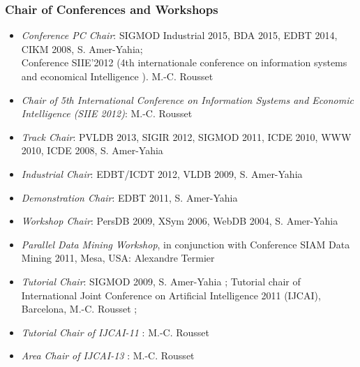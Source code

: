 \subsubsection*{Chair  of Conferences and Workshops}

\begin{itemize}
\setlength{\itemindent}{-0.5cm}
\setlength{\itemsep}{-0.1cm}

\item \emph{Conference PC Chair}: SIGMOD Industrial 2015, BDA 2015, EDBT 2014, CIKM 2008,  S. Amer-Yahia;  \\ 
Conference SIIE'2012 (4th internationale conference  on information systems and economical Intelligence ). M.-C. Rousset 

\item \emph{ Chair of 5th International Conference on Information Systems and Economic Intelligence (SIIE 2012)}: M.-C. Rousset


\item \emph{Track Chair}: PVLDB 2013, SIGIR 2012, SIGMOD 2011, ICDE 2010, WWW 2010, ICDE 2008, S. Amer-Yahia

\item \emph{Industrial Chair}: EDBT/ICDT 2012, VLDB 2009,  S. Amer-Yahia

\item \emph{Demonstration Chair}: EDBT 2011, S. Amer-Yahia

\item \emph{Workshop Chair}: PersDB 2009, XSym 2006, WebDB 2004, S. Amer-Yahia

\item \emph{Parallel Data Mining Workshop}, in conjunction with Conference SIAM Data Mining 2011,  Mesa, USA: Alexandre Termier  

\item \emph{Tutorial Chair}: SIGMOD 2009, S. Amer-Yahia ; Tutorial chair of International Joint Conference on Artificial Intelligence 2011 (IJCAI),  Barcelona,  M.-C. Rousset ; 

\item \emph{ Tutorial Chair of IJCAI-11 }: M.-C. Rousset

\item \emph{ Area Chair of IJCAI-13 }: M.-C. Rousset
 
\end{itemize}
